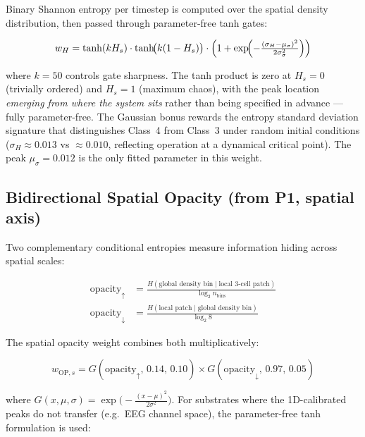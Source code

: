 \documentclass[12pt,a4paper]{article}
\begin{document}
Binary Shannon entropy per timestep is computed over the spatial
density distribution, then passed through parameter-free tanh gates:

\begin{equation}
w_H = \tanh(kH_s)\cdot\tanh\!\bigl(k(1-H_s)\bigr)
      \cdot\Bigl(1 + \exp\!\Bigl(-\tfrac{(\sigma_H-\mu_\sigma)^2}
      {2\sigma_\sigma^2}\Bigr)\Bigr)
\label{eq:wH}
\end{equation}

where $k=50$ controls gate sharpness.
The tanh product is zero at $H_s=0$ (trivially ordered) and $H_s=1$
(maximum chaos), with the peak location \emph{emerging from where the
system sits} rather than being specified in advance --- fully
parameter-free.
The Gaussian bonus rewards the entropy standard deviation signature
that distinguishes Class~4 from Class~3 under random initial
conditions ($\sigma_H \approx 0.013$ vs $\approx 0.010$, reflecting
operation at a dynamical critical point).
The peak $\mu_\sigma = 0.012$ is the only fitted parameter in this
weight.

\subsection{Bidirectional Spatial Opacity (from P1, spatial axis)}

Two complementary conditional entropies measure information hiding
across spatial scales:

\begin{align}
\text{opacity}_\uparrow &=
  \frac{H(\text{global density bin} \mid \text{local 3-cell patch})}
       {\log_2 n_\text{bins}}
\label{eq:opup}\\[4pt]
\text{opacity}_\downarrow &=
  \frac{H(\text{local patch} \mid \text{global density bin})}
       {\log_2 8}
\label{eq:opdown}
\end{align}

The spatial opacity weight combines both multiplicatively:

\begin{equation}
w_{\text{OP},s} = G(\text{opacity}_\uparrow,\,0.14,\,0.10)
                  \times G(\text{opacity}_\downarrow,\,0.97,\,0.05)
\label{eq:wops}
\end{equation}

where $G(x,\mu,\sigma) = \exp\!\bigl(-\frac{(x-\mu)^2}{2\sigma^2}\bigr)$.
For substrates where the 1D-calibrated peaks do not transfer (e.g.\
EEG channel space), the parameter-free tanh formulation is used:
\end{document}
